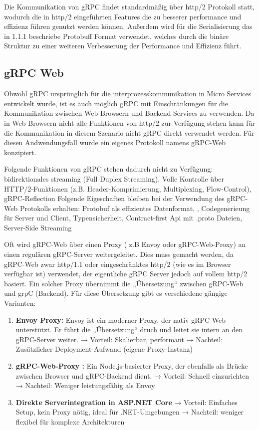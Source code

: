 Die Kommunikation von gRPC findet standardmäßig über http/2 Protokoll statt, wodurch die in http/2 eingeführten Features die zu besserer performance und effizienz führen genutzt werden können. Außerdem wird für die Serialisierung  das in 1.1.1 beschriebe Protobuff Format verwendet, welches durch die binäre Struktur zu einer weiteren Verbesserung der Performance und Effizienz führt.

\subsection{gRPC Web}
Obwohl gRPC ursprünglich für die interprozesskommunikation in Micro Services entwickelt wurde, ist es auch möglich gRPC mit Einschränkungen für die Kommunikation zwischen Web-Browsern und Backend Services zu verwenden.
Da in Web Browsern nicht alle Funktionen von http/2 zur Verfügung stehen kann für die Kommunikation in diesem Szenario nicht gRPC direkt verwendet werden. Für diesen Andwendungsfall wurde ein eigenes Protokoll namens gRPC-Web konzipiert. 

Folgende Funktionen von gRPC stehen dadurch nicht zu Verfügung:
bidirektionales streaming (Full Duplex Streaming), Volle Kontrolle über HTTP/2-Funktionen (z.B. Header-Komprimierung, Multiplexing, Flow-Control), gRPC-Reflection
Folgende Eigeschaften bleiben bei der Verwendung des gRPC-Web Protokolls erhalten:
Protobuf als effizientes Datenformat, , Codegenerieung für Server und Client, Typensicherheit, Contract-first Api mit .proto Dateien, Server-Side Streaming

Oft wird gRPC-Web über einen Proxy ( z.B Envoy oder gRPC-Web-Proxy) an einen regulären gRPC-Server weitergeleitet. Dies muss gemacht werden, da gRPC-Web zwar http/1.1 oder eingeschränktes http/2 (wie es im Browser verfügbar ist) verwendet, der eigentliche gRPC Server jedoch auf vollem http/2 basiert. Ein solcher Proxy übernimmt die „Übersetzung“ zwischen gRPC-Web und grpC (Backend). Für diese Übersetzung gibt es verschiedene gängige Varianten:

\begin{enumerate}
	\item \textbf{Envoy Proxy:}
	Envoy ist ein moderner Proxy, der nativ gRPC-Web unterstützt. Er führt die „Übersetzung“ druch und leitet sie intern an den gRPC-Server weiter.
	→ Vorteil: Skalierbar, performant
	→ Nachteil: Zusätzlicher Deployment-Aufwand (eigene Proxy-Instanz)
	
	\item \textbf{gRPC-Web-Proxy :}
	Ein Node.js-basierter Proxy, der ebenfalls als Brücke zwischen Browser und gRPC-Backend dient.
	→ Vorteil: Schnell einzurichten
	→ Nachteil: Weniger leistungsfähig als Envoy
	
	\item \textbf{Direkte Serverintegration in ASP.NET Core}
	→ Vorteil: Einfaches Setup, kein Proxy nötig, ideal für .NET-Umgebungen
	→ Nachteil: weniger flexibel für komplexe Architekturen
\end{enumerate}

